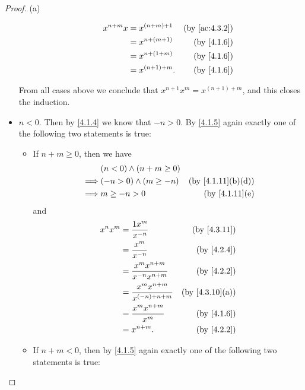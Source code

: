 \begin{proof}{(a)}
\begin{itemize}
\begin{itemize}
\begin{align*}
                    x^{n + m} x & = x^{(n + m) + 1}  & \text{(by \cref{ac:4.3.2})} \\
                                & = x^{n + (m + 1)}  & \text{(by \cref{4.1.6})}    \\
                                & = x^{n + (1 + m)}  & \text{(by \cref{4.1.6})}    \\
                                & = x^{(n + 1) + m}. & \text{(by \cref{4.1.6})}
                  \end{align*}
          \end{itemize}
          From all cases above we conclude that \(x^{n + 1} x^m = x^{(n + 1) + m}\), and this closes the induction.
    \item \(n < 0\).
          Then by \cref{4.1.4} we know that \(-n > 0\).
          By \cref{4.1.5} again exactly one of the following two statements is true:
          \begin{itemize}
            \item If \(n + m \geq 0\), then we have
                  \begin{align*}
                             & (n < 0) \land (n + m \geq 0)                                   \\
                    \implies & (-n > 0) \land (m \geq -n)   & \text{(by \cref{4.1.11}(b)(d))} \\
                    \implies & m \geq -n > 0                & \text{(by \cref{4.1.11}(e)}
                  \end{align*}
                  and
                  \begin{align*}
                    x^n x^m & = \frac{1x^m}{x^{-n}}                    & \text{(by \cref{4.3.11})}    \\
                            & = \frac{x^m}{x^{-n}}                     & \text{(by \cref{4.2.4})}     \\
                            & = \frac{x^m x^{n + m}}{x^{-n} x^{n + m}} & \text{(by \cref{4.2.2})}     \\
                            & = \frac{x^m x^{n + m}}{x^{(-n) + n + m}} & \text{(by \cref{4.3.10}(a))} \\
                            & = \frac{x^m x^{n + m}}{x^m}              & \text{(by \cref{4.1.6})}     \\
                            & = x^{n + m}.                             & \text{(by \cref{4.2.2})}
                  \end{align*}
            \item If \(n + m < 0\), then by \cref{4.1.5} again exactly one of the following two statements is true:

\end{itemize}
\end{itemize}
\end{proof}
